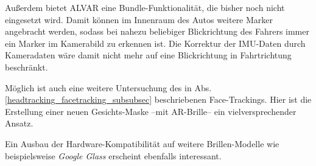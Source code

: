 Außerdem bietet ALVAR eine Bundle-Funktionalität, die bisher noch nicht eingesetzt wird.
Damit können im Innenraum des Autos weitere Marker angebracht werden, sodass bei nahezu beliebiger Blickrichtung des Fahrers immer ein Marker im Kamerabild zu erkennen ist.
Die Korrektur der \ac{IMU}-Daten durch Kameradaten wäre damit nicht mehr auf eine Blickrichtung in Fahrtrichtung beschränkt.

Möglich ist auch eine weitere Untersuchung des in Abs. \ref{headtracking_facetracking_subsubsec} beschriebenen Face-Trackings.
Hier ist die Erstellung einer neuen Gesichts-Maske --mit \ac{AR}-Brille-- ein vielversprechender Ansatz.

Ein Ausbau der Hardware-Kompatibilität auf weitere Brillen-Modelle wie beispielsweise \emph{Google Glass} \oae erscheint ebenfalls interessant.


